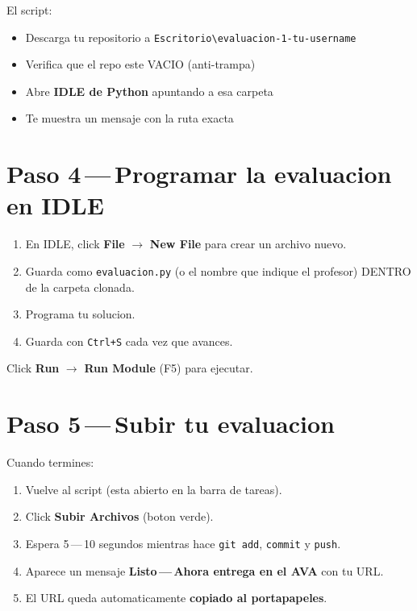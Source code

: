 \documentclass[11pt,a4paper,oneside]{report}
\begin{document}
El script:

\begin{itemize}
  \item Descarga tu repositorio a \texttt{Escritorio\textbackslash{}evaluacion-1-tu-username}
  \item Verifica que el repo este VACIO (anti-trampa)
  \item Abre \textbf{IDLE de Python} apuntando a esa carpeta
  \item Te muestra un mensaje con la ruta exacta
\end{itemize}

\section{Paso 4\,---\,Programar la evaluacion en IDLE}

\begin{enumerate}
  \item En IDLE, click \textbf{File} $\rightarrow$ \textbf{New File} para crear un archivo nuevo.
  \item Guarda como \texttt{evaluacion.py} (o el nombre que indique el profesor) DENTRO de la carpeta clonada.
  \item Programa tu solucion.
  \item Guarda con \texttt{Ctrl+S} cada vez que avances.
\end{enumerate}

\begin{notebox}
Click \textbf{Run} $\rightarrow$ \textbf{Run Module} (F5) para ejecutar.
\end{notebox}

\section{Paso 5\,---\,Subir tu evaluacion}

Cuando termines:

\begin{enumerate}
  \item Vuelve al script (esta abierto en la barra de tareas).
  \item Click \textbf{Subir Archivos} (boton verde).
  \item Espera 5\,---\,10 segundos mientras hace \texttt{git add}, \texttt{commit} y \texttt{push}.
  \item Aparece un mensaje \textbf{Listo\,---\,Ahora entrega en el AVA} con tu URL.
  \item El URL queda automaticamente \textbf{copiado al portapapeles}.
\end{enumerate}
\end{document}
